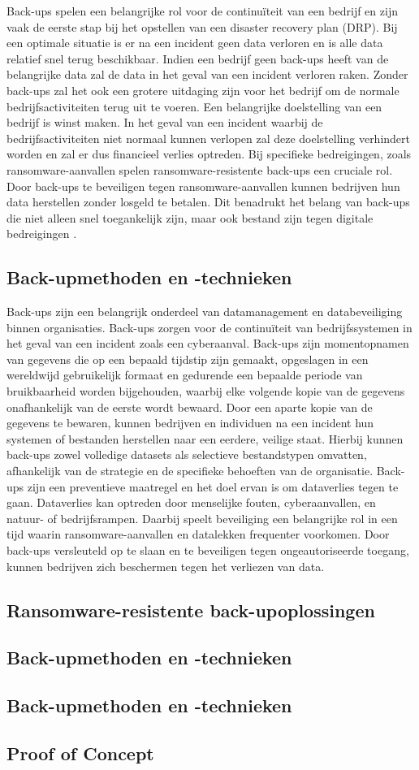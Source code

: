 Back-ups spelen een belangrijke rol voor de continuïteit van een bedrijf en zijn vaak de eerste stap bij het opstellen van een disaster recovery plan (DRP). Bij een optimale situatie is er na een incident geen data verloren en is alle data relatief snel terug beschikbaar. Indien een bedrijf geen back-ups heeft van de belangrijke data zal de data in het geval van een incident verloren raken. Zonder back-ups zal het ook een grotere uitdaging zijn voor het bedrijf om de normale bedrijfsactiviteiten terug uit te voeren. Een belangrijke doelstelling van een bedrijf is winst maken. In het geval van een incident waarbij de bedrijfsactiviteiten niet normaal kunnen verlopen zal deze doelstelling verhindert worden en zal er dus financieel verlies optreden. Bij specifieke bedreigingen, zoals ransomware-aanvallen spelen ransomware-resistente back-ups een cruciale rol. Door back-ups te beveiligen tegen ransomware-aanvallen kunnen bedrijven hun data herstellen zonder losgeld te betalen. Dit benadrukt het belang van back-ups die niet alleen snel toegankelijk zijn, maar ook bestand zijn tegen digitale bedreigingen \autocite{Ghazi2013}.

\subsection{Back-upmethoden en -technieken}
Back-ups zijn een belangrijk onderdeel van datamanagement en databeveiliging binnen organisaties. Back-ups zorgen voor de continuïteit van bedrijfssystemen in het geval van een incident zoals een cyberaanval. Back-ups zijn momentopnamen van gegevens die op een bepaald tijdstip zijn gemaakt, opgeslagen in een wereldwijd gebruikelijk formaat en gedurende een bepaalde periode van bruikbaarheid worden bijgehouden, waarbij elke volgende kopie van de gegevens onafhankelijk van de eerste wordt bewaard\autocite{Nelson2011}. Door een aparte kopie van de gegevens te bewaren, kunnen bedrijven en individuen na een incident hun systemen of bestanden herstellen naar een eerdere, veilige staat. Hierbij kunnen back-ups zowel volledige datasets als selectieve bestandstypen omvatten, afhankelijk van de strategie en de specifieke behoeften van de organisatie. Back-ups zijn een preventieve maatregel en het doel ervan is om dataverlies tegen te gaan. Dataverlies kan optreden door menselijke fouten, cyberaanvallen, en natuur- of bedrijfsrampen. Daarbij speelt beveiliging een belangrijke rol in een tijd waarin ransomware-aanvallen en datalekken frequenter voorkomen. Door back-ups versleuteld op te slaan en te beveiligen tegen ongeautoriseerde toegang, kunnen bedrijven zich beschermen tegen het verliezen van data. 
\subsection{Ransomware-resistente back-upoplossingen}
\subsection{Back-upmethoden en -technieken}
\subsection{Back-upmethoden en -technieken}
\subsection{Proof of Concept}